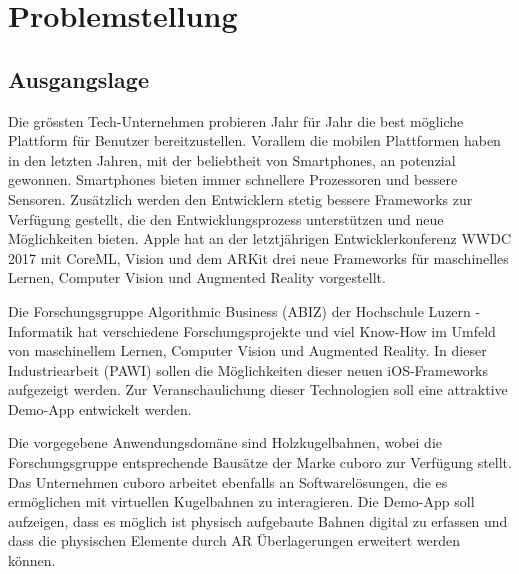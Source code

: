 \section{Problemstellung}

\subsection{Ausgangslage}


Die grössten Tech-Unternehmen probieren Jahr für Jahr die best mögliche Plattform für Benutzer bereitzustellen. Vorallem die mobilen Plattformen haben in den letzten Jahren, mit der beliebtheit von Smartphones, an potenzial gewonnen. Smartphones bieten immer schnellere Prozessoren und bessere Sensoren. Zusätzlich werden den Entwicklern stetig bessere Frameworks zur Verfügung gestellt, die den Entwicklungsprozess unterstützen und neue Möglichkeiten bieten. Apple hat an der letztjährigen Entwicklerkonferenz WWDC 2017 mit CoreML, Vision und dem ARKit drei neue Frameworks für maschinelles Lernen, Computer Vision und Augmented Reality vorgestellt.


Die Forschungsgruppe Algorithmic Business (ABIZ) der Hochschule Luzern - Informatik hat verschiedene Forschungsprojekte und viel Know-How im Umfeld von maschinellem Lernen, Computer Vision und Augmented Reality. In dieser Industriearbeit (PAWI) sollen die Möglichkeiten dieser neuen iOS-Frameworks aufgezeigt werden. Zur Veranschaulichung dieser Technologien soll eine attraktive Demo-App entwickelt werden. 


Die vorgegebene Anwendungsdomäne sind Holzkugelbahnen, wobei die Forschungsgruppe entsprechende Bausätze der Marke cuboro zur Verfügung stellt. Das Unternehmen cuboro arbeitet ebenfalls an Softwarelösungen, die es ermöglichen mit virtuellen Kugelbahnen zu interagieren. Die Demo-App soll aufzeigen, dass es möglich ist physisch aufgebaute Bahnen digital zu erfassen und dass die physischen Elemente durch AR Überlagerungen erweitert werden können.


